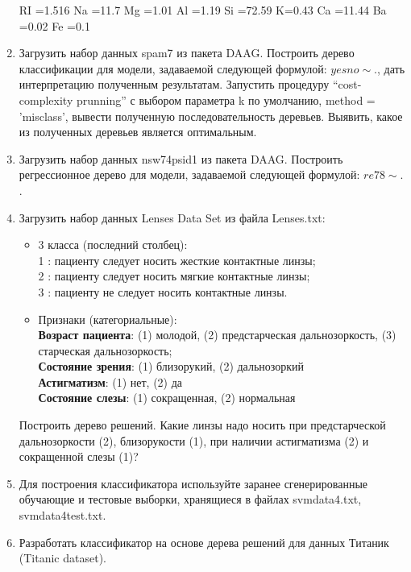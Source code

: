 \documentclass[]{article}
\numberwithin{equation}{section}
\begin{document}
\begin{enumerate}
        RI =1.516 Na =11.7 Mg =1.01 Al =1.19 Si =72.59 K=0.43 Ca =11.44 Ba =0.02 Fe =0.1
        \item Загрузить набор данных spam7 из пакета DAAG. Построить дерево классификации для модели, задаваемой следующей формулой: $yesno \sim.$, дать интерпретацию полученным результатам. Запустить процедуру “cost-complexity prunning” с выбором параметра k по умолчанию, method = ’misclass’, вывести полученную последовательность деревьев. Выявить, какое из полученных деревьев является оптимальным.
        \item Загрузить набор данных nsw74psid1 из пакета DAAG. Построить регрессионное дерево для модели, задаваемой следующей формулой: $re78 \sim.$.
        \item Загрузить набор данных Lenses Data Set из файла Lenses.txt:
            \begin{itemize}
                \item 3 класса (последний столбец):\\
                1 : пациенту следует носить жесткие контактные линзы;\\
                2 : пациенту следует носить мягкие контактные линзы;\\
                3 : пациенту не следует носить контактные линзы.
                \item Признаки (категориальные):\\
                \textbf{Возраст пациента}: (1) молодой, (2) предстарческая дальнозоркость, (3) старческая дальнозоркость;\\
                \textbf{Состояние зрения}: (1) близорукий, (2) дальнозоркий\\
                \textbf{Астигматизм}: (1) нет, (2) да\\
                \textbf{Состояние слезы}: (1) сокращенная, (2) нормальная
            \end{itemize}
            Построить дерево решений. Какие линзы надо носить при предстарческой дальнозоркости (2), близорукости (1), при наличии астигматизма (2) и сокращенной слезы (1)?
        \item Для построения классификатора используйте заранее сгенерированные обучающие и тестовые выборки, хранящиеся в файлах svmdata4.txt, svmdata4test.txt.
        \item Разработать классификатор на основе дерева решений для данных Титаник (Titanic dataset).
    \end{enumerate}

    \newpage
\end{document}
